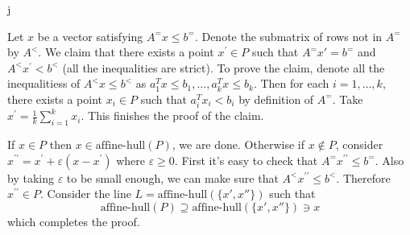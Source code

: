 j\documentclass[11pt]{article}
\renewcommand{\leq}{\leqslant}
\renewcommand{\geq}{\geqslant}
\begin{document}
\begin{enumerate}[1)]
\begin{solution}
\begin{enumerate}
Let  $x$ be a vector satisfying $ A^= x \leq b^=$. 
Denote the submatrix of rows not in $A^=$ by $A^<$. 
We claim that there exists a point $x^\prime \in P$ such that $A^= x' = b^=$ and $A^< x^\prime < b^<$ (all the inequalities are strict). To prove the claim, denote all the inequalitiess of $A^< x\leq b^<$ as $a_1^T x \leq b_1, \dots, a_k^T x \leq b_k$. Then for each $i = 1, \dots, k$, there exists a point $x_i \in P$ such that $a_i^T x_i < b_i$ by definition of $A^=$. 
Take $x^\prime = \frac{1}{k} \sum_{i=1}^k x_i$. This finishes the proof of the claim.


If $x \in P$ then $x \in \text{affine-hull}(P)$, we are done. 
Otherwise if $x \notin P$, consider $x^{\prime\prime} = x^\prime + \varepsilon(x-x^\prime)$ where $\varepsilon\geq 0$. 
First it's easy to check that $A^= x^{\prime\prime} \leq b^=$.
Also by taking $\varepsilon$ to be small enough, we can make sure that $A^< x^{\prime\prime} \leq b^<$. Therefore $x^{\prime\prime} \in P$.
Consider the line $L = \text{affine-hull}(\{x', x''\})$ such that $$\text{affine-hull}(P) \supseteq \text{affine-hull}(\{x', x''\}) \ni x$$
which completes the proof.
\end{enumerate}

\end{solution}


\end{enumerate}



  
\end{document}
